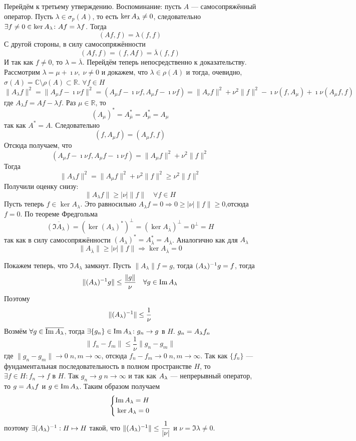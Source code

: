 \documentclass[14pt]{extarticle}
\begin{document}
\begin{Proof}
    Перейдём к третьему утверждению.
    Воспоминание: пусть $A$ --- самосопряжённый оператор.
    Пусть $\lambda \in \sigma_p(A)$, то есть $\ker \Al \ne 0$, следовательно
    $\exists f \ne 0 \in \ker \Al\colon Af = \lambda f$.
    Тогда 
    $$
    (Af, f) = \lambda (f, f)
    $$
    С другой стороны, в силу самосопряжённости
    $$
    (Af, f) = (f, Af) = \overline{\lambda}(f, f)
    $$
    И так как $f \ne 0$, то $\lambda = \overline{\lambda}$.
    Перейдём теперь непосредственно к доказательству.
    Рассмотрим $\lambda = \mu + \imath \nu,\; \nu \ne 0$ и докажем, что
    $\lambda \in \rho(A)$ и тогда, очевидно, $\sigma(A)
    = \mathbb C \setminus \rho(A) \subset \mathbb R$.
    $\forall f \in H$
    $$
    \|A_\lambda f\|^2 = \|A_\mu f - \imath \nu f\|^2 = (A_\mu f - \imath \nu
    f, A_\mu f - \imath \nu f) = \|A_\nu f\|^2 + 
    \nu^2 \|f\|^2 - \imath \nu (f, A_\mu) + \imath \nu (A_\mu f, f)
    $$
    где $A_\lambda f = Af - \lambda f$.
    Раз $\mu \in \mathbb R$, то 
    $$
    (A_\mu)^* = A^*_{\overline{\mu}} = A^*_\mu = A_\mu
    $$
    так как $A^* = A$.
    Следовательно
    $$
    (f, A_\mu f) = (A_\mu f, f)
    $$
    Отсюда получаем, что
    $$
    (A_\mu f - \imath \nu f, A_\mu f - \imath \nu f) = \|A_\mu f\|^2 + \nu^2
    \|f\|^2
    $$
    Тогда
    $$
    \|A_\lambda f\|^2 = \|A_\mu f\|^2 + \nu^2\|f\|^2 \ge \nu^2 \|f\|^2
    $$
    Получили оценку снизу:
    $$
    \|A_\lambda f\| \ge |\nu| \|f\| \quad \forall f \in H
    $$
    Пусть теперь $f \in \ker A_\lambda$.
    Это равносильно $A_\lambda f = 0 \Rightarrow 0 \ge |\nu|\|f\| \ge
    0$,отсюда $f = 0$.
    По теореме Фредгольма 
    $$
    \overline{(\Im A_\lambda)} = (\ker(A_\lambda)^*)^\perp = (\ker
    A_{\overline
    {\lambda}})^\perp = 0^\perp = H
    $$
    так как в силу самосопряжённости $(A_\lambda)^* = A^*_{\overline{\lambda}} 
    = A_{\overline{\lambda}}$.
    Аналогично как для $A_\lambda$
    $$
    \|A_{\overline{\lambda}}\| \ge |\nu| \|f\| \Rightarrow \ker
    A_{\overline{\lambda}} = 0
    $$
    
    Покажем теперь, что $\Im A_\lambda$ замкнут.
    Пусть $\|A_\lambda\|f = g$, тогда $(A_\lambda)^{-1} g =f$, тогда
    $$
    \|\Alo g\| \le \dfrac{\|g\|}{\nu} \quad \forall g \in \Im \Al
    $$
    Поэтому
    $$
    \|(A_\lambda)^{-1}\| \le \dfrac{1}{\nu}
    $$
    Возмём $\forall g \in \overline{\Im \Al}$, тогда $\exists \{g_n\} \in \Im
    \Al\colon g_n \to g$ в $H$.
    $g_n = \Al f_n$
    $$
    \|f_n - f_m\| \le \dfrac{1}{\nu}\|g_n - g_m\|
    $$
    где $\|g_n - g_m\| \to 0\; n,m \to \infty$, отсюда $f_n - f_m \to 0\; n,m 
    \to \infty$.
    Так как $\{f_n\}$ --- фундаментальная последовательность в полном 
    пространстве $H$, то $\exists f \in H\colon f_n \to f$ 
    в $H$.
    Так $g_n \to g\; n \to \infty$ и так как $\Al$ --- непрерывный оператор, 
    то $g = \Al f$ и $g \in \Im \Al$.
    Таким образом получаем
    $$
    \left\{
        \begin{aligned}
            \Im {\Al} = H\\
            \ker {\Al} = 0
        \end{aligned}
   \right.
   $$
   поэтому $\exists (A_\lambda)^{-1} : H \mapsto H$ такой, что $\|(A_\lambda)^{-1}\| \le \dfrac{1}{|
   \nu|}$ и $\nu = \Im \lambda \ne 0$.
\end{Proof}
\end{document}
